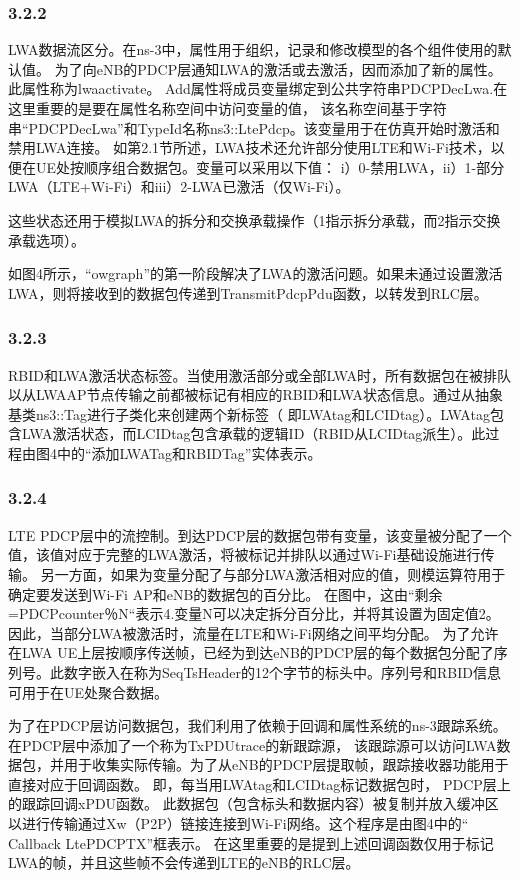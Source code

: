\subsubsection*{3.2.2}
LWA数据流区分。在ns-3中，属性用于组织，记录和修改模型的各个组件使用的默认值。
为了向eNB的PDCP层通知LWA的激活或去激活，因而添加了新的属性。此属性称为lwaactivate。
Add属性将成员变量绑定到公共字符串PDCPDecLwa.在这里重要的是要在属性名称空间中访问变量的值，
该名称空间基于字符串“PDCPDecLwa”和TypeId名称ns3::LtePdcp。该变量用于在仿真开始时激活和禁用LWA连接。
如第2.1节所述，LWA技术还允许部分使用LTE和Wi-Fi技术，以便在UE处按顺序组合数据包。变量可以采用以下值：
i）0-禁用LWA，ii）1-部分LWA（LTE+Wi-Fi）和iii）2-LWA已激活（仅Wi-Fi）。

这些状态还用于模拟LWA的拆分和交换承载操作（1指示拆分承载，而2指示交换承载选项）。

如图4所示，“owgraph”的第一阶段解决了LWA的激活问题。如果未通过设置激活LWA，则将接收到的数据包传递到TransmitPdcpPdu函数，以转发到RLC层。

\subsubsection*{3.2.3}
RBID和LWA激活状态标签。当使用激活部分或全部LWA时，所有数据包在被排队以从LWAAP节点传输之前都被标记有相应的RBID和LWA状态信息。通过从抽象基类ns3::Tag进行子类化来创建两个新标签（
即LWAtag和LCIDtag）。LWAtag包含LWA激活状态，而LCIDtag包含承载的逻辑ID（RBID从LCIDtag派生）。此过程由图4中的“添加LWATag和RBIDTag”实体表示。

\subsubsection*{3.2.4}
LTE PDCP层中的流控制。到达PDCP层的数据包带有变量，该变量被分配了一个值，该值对应于完整的LWA激活，将被标记并排队以通过Wi-Fi基础设施进行传输。
另一方面，如果为变量分配了与部分LWA激活相对应的值，则模运算符用于确定要发送到Wi-Fi AP和eNB的数据包的百分比。
在图中，这由“剩余=PDCPcounter％N“表示4.变量N可以决定拆分百分比，并将其设置为固定值2。因此，当部分LWA被激活时，流量在LTE和Wi-Fi网络之间平均分配。
为了允许在LWA UE上层按顺序传送帧，已经为到达eNB的PDCP层的每个数据包分配了序列号。此数字嵌入在称为SeqTsHeader的12个字节的标头中。序列号和RBID信息可用于在UE处聚合数据。

为了在PDCP层访问数据包，我们利用了依赖于回调和属性系统的ns-3跟踪系统。在PDCP层中添加了一个称为TxPDUtrace的新跟踪源，
该跟踪源可以访问LWA数据包，并用于收集实际传输。为了从eNB的PDCP层提取帧，跟踪接收器功能用于直接对应于回调函数。
即，每当用LWAtag和LCIDtag标记数据包时，
PDCP层上的跟踪回调xPDU函数。
此数据包（包含标头和数据内容）被复制并放入缓冲区以进行传输通过Xw（P2P）链接连接到Wi-Fi网络。这个程序是由图4中的“ Callback LtePDCPTX”框表示。
在这里重要的是提到上述回调函数仅用于标记LWA的帧，并且这些帧不会传递到LTE的eNB的RLC层。

